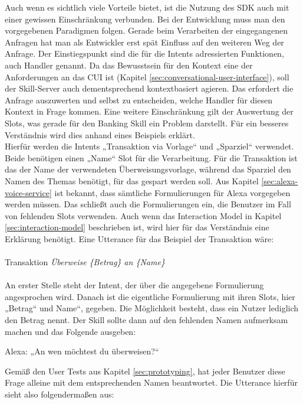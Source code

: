 Auch wenn es sichtlich viele Vorteile bietet, ist die Nutzung des \ac{SDK} auch mit einer gewissen Einschränkung verbunden. Bei der Entwicklung muss man den vorgegebenen Paradigmen folgen. Gerade beim Verarbeiten der eingegangenen Anfragen hat man als Entwickler erst spät Einfluss auf den weiteren Weg der Anfrage. Der Einstiegspunkt sind die für die Intents adressierten Funktionen, auch Handler genannt. Da das Bewusstsein für den Kontext eine der Anforderungen an das \ac{CUI} ist (\vgl Kapitel \ref{sec:conversational-user-interface}), soll der Skill-Server auch dementsprechend kontextbasiert agieren. Das erfordert die Anfrage auszuwerten und selbst zu entscheiden, welche Handler für diesen Kontext in Frage kommen. Eine weitere Einschränkung gilt der Auswertung der Slots, was gerade für den Banking Skill ein Problem darstellt. Für ein besseres Verständnis wird dies anhand eines Beispiels erklärt.\\
Hierfür werden die Intents „Transaktion via Vorlage“ und „Sparziel“ verwendet. Beide benötigen einen „Name“ Slot für die Verarbeitung. Für die Transaktion ist das der Name der verwendeten Überweisungsvorlage, während das Sparziel den Namen des Themas benötigt, für das gespart werden soll. Aus Kapitel \ref{sec:alexa-voice-service} ist bekannt, dass sämtliche Formulierungen für Alexa vorgegeben werden müssen. Das schließt auch die Formulierungen ein, die Benutzer im Fall von fehlenden Slots verwenden. Auch wenn das Interaction Model in Kapitel \ref{sec:interaction-model} beschrieben ist, wird hier für das Verständnis eine Erklärung benötigt. Eine Utterance für das Beispiel der Transaktion wäre:\\\\
Transaktion \textit{Überweise \{Betrag\} an \{Name\}}
\\\\
An erster Stelle steht der Intent, der über die angegebene Formulierung angesprochen wird. Danach ist die eigentliche Formulierung mit ihren Slots, hier „Betrag“ und Name“, gegeben. Die Möglichkeit besteht, dass ein Nutzer lediglich den Betrag nennt. Der Skill sollte dann auf den fehlenden Namen aufmerksam machen und \zB das Folgende ausgeben:
\begin{center}
   \textcolor{mybluelight}{Alexa: „An wen möchtest du überweisen?“}
\end{center}
Gemäß den User Tests aus Kapitel \ref{sec:prototyping}, hat jeder Benutzer diese Frage alleine mit dem entsprechenden Namen beantwortet. Die Utterance hierfür sieht also folgendermaßen aus:\\\\
